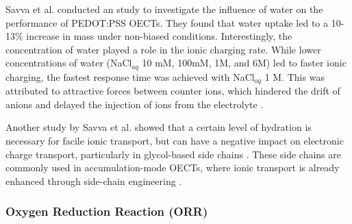 Savva et al. conducted an study to investigate the influence of water on the performance of PEDOT:PSS OECTs. They found that water uptake %
led to a 10-13\% increase in mass under non-biased conditions. Interestingly, the concentration of water played a role in the ionic charging rate. While lower concentrations of water (NaCl$_{aq}$ 10 mM, 100mM, 1M, and 6M) led to faster ionic charging, %
the fastest %
response time was achieved with NaCl$_{aq}$ 1 M. This was attributed to attractive forces between counter ions, which %
hindered the drift of anions and delayed the injection of ions from the electrolyte %
\cite{savvaInfluenceWaterPerformance2019}.


Another study by Savva et al. showed that a certain level of hydration is necessary for facile ionic transport, but can have a negative impact on electronic charge transport, particularly in glycol-based side chains \cite{savvaBalancingIonicElectronic2020}. These side chains are commonly used in accumulation-mode OECTs, where ionic transport is already enhanced through side-chain engineering \cite{moiaDesignEvaluationConjugated2019}. %


\subsubsection{Oxygen Reduction Reaction (ORR)}

